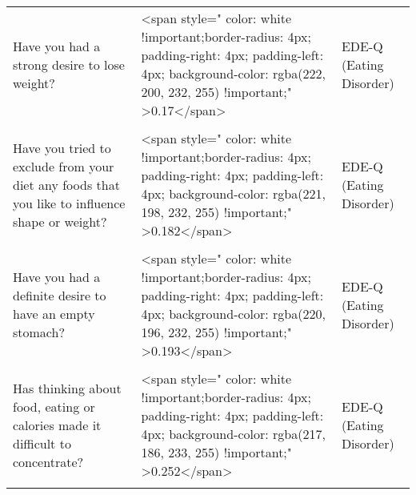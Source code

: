 \documentclass[border=1mm]{standalone}
\begin{document}
\begin{longtable}{lll}
Have you had a strong desire to lose weight? & <span style="     color: white !important;border-radius: 4px; padding-right: 4px; padding-left: 4px; background-color: rgba(222, 200, 232, 255) !important;" >0.17</span> & EDE-Q (Eating Disorder)\\
\cellcolor{gray!10}{Have you gone for long periods of time without eating to influence shape or weight?} & \cellcolor{gray!10}{<span style="     color: white !important;border-radius: 4px; padding-right: 4px; padding-left: 4px; background-color: rgba(219, 190, 233, 255) !important;" >0.226</span>} & \cellcolor{gray!10}{EDE-Q (Eating Disorder)}\\
Have you tried to exclude from your diet any foods that you like to influence shape or weight? & <span style="     color: white !important;border-radius: 4px; padding-right: 4px; padding-left: 4px; background-color: rgba(221, 198, 232, 255) !important;" >0.182</span> & EDE-Q (Eating Disorder)\\
\addlinespace
\cellcolor{gray!10}{Have you tried to follow definite rules regarding your eating?} & \cellcolor{gray!10}{<span style="     color: white !important;border-radius: 4px; padding-right: 4px; padding-left: 4px; background-color: rgba(222, 201, 232, 255) !important;" >0.163</span>} & \cellcolor{gray!10}{EDE-Q (Eating Disorder)}\\
Have you had a definite desire to have an empty stomach? & <span style="     color: white !important;border-radius: 4px; padding-right: 4px; padding-left: 4px; background-color: rgba(220, 196, 232, 255) !important;" >0.193</span> & EDE-Q (Eating Disorder)\\
\cellcolor{gray!10}{Have you had a definite desire to have a totally flat stomach?} & \cellcolor{gray!10}{<span style="     color: white !important;border-radius: 4px; padding-right: 4px; padding-left: 4px; background-color: rgba(223, 206, 232, 255) !important;" >0.135</span>} & \cellcolor{gray!10}{EDE-Q (Eating Disorder)}\\
Has thinking about food, eating or calories made it difficult to concentrate? & <span style="     color: white !important;border-radius: 4px; padding-right: 4px; padding-left: 4px; background-color: rgba(217, 186, 233, 255) !important;" >0.252</span> & EDE-Q (Eating Disorder)\\
\cellcolor{gray!10}{Has thinking about shape or weight made it difficult to concentrate?} & \cellcolor{gray!10}{<span style="     color: white !important;border-radius: 4px; padding-right: 4px; padding-left: 4px; background-color: rgba(212, 170, 235, 255) !important;" >0.344</span>} & \cellcolor{gray!10}{EDE-Q (Eating Disorder)}\\

\end{longtable}
\end{document}
